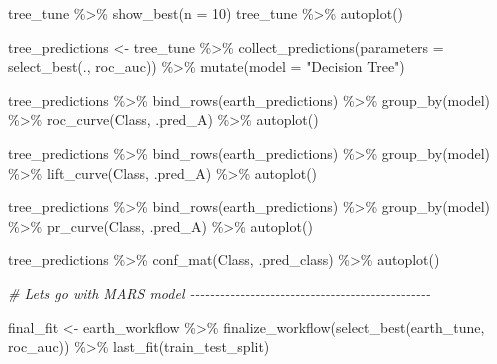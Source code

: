 \documentclass[
]{book}
\newenvironment{Shaded}{\begin{snugshade}}{\end{snugshade}}
\newcommand{\AttributeTok}[1]{\textcolor[rgb]{0.77,0.63,0.00}{#1}}
\newcommand{\CommentTok}[1]{\textcolor[rgb]{0.56,0.35,0.01}{\textit{#1}}}
\newcommand{\DecValTok}[1]{\textcolor[rgb]{0.00,0.00,0.81}{#1}}
\newcommand{\FunctionTok}[1]{\textcolor[rgb]{0.00,0.00,0.00}{#1}}
\newcommand{\NormalTok}[1]{#1}
\newcommand{\OtherTok}[1]{\textcolor[rgb]{0.56,0.35,0.01}{#1}}
\newcommand{\SpecialCharTok}[1]{\textcolor[rgb]{0.00,0.00,0.00}{#1}}
\newcommand{\StringTok}[1]{\textcolor[rgb]{0.31,0.60,0.02}{#1}}
\begin{document}
\begin{Shaded}
\begin{Highlighting}[]
\NormalTok{tree\_tune }\SpecialCharTok{\%\textgreater{}\%} \FunctionTok{show\_best}\NormalTok{(}\AttributeTok{n =} \DecValTok{10}\NormalTok{)}
\NormalTok{tree\_tune }\SpecialCharTok{\%\textgreater{}\%} \FunctionTok{autoplot}\NormalTok{()}

\NormalTok{tree\_predictions }\OtherTok{\textless{}{-}}\NormalTok{ tree\_tune }\SpecialCharTok{\%\textgreater{}\%}
  \FunctionTok{collect\_predictions}\NormalTok{(}\AttributeTok{parameters =} \FunctionTok{select\_best}\NormalTok{(., }\StringTok{\textquotesingle{}roc\_auc\textquotesingle{}}\NormalTok{)) }\SpecialCharTok{\%\textgreater{}\%}
  \FunctionTok{mutate}\NormalTok{(}\AttributeTok{model =} \StringTok{"Decision Tree"}\NormalTok{)}

\NormalTok{tree\_predictions }\SpecialCharTok{\%\textgreater{}\%}
  \FunctionTok{bind\_rows}\NormalTok{(earth\_predictions) }\SpecialCharTok{\%\textgreater{}\%}
  \FunctionTok{group\_by}\NormalTok{(model) }\SpecialCharTok{\%\textgreater{}\%}
  \FunctionTok{roc\_curve}\NormalTok{(Class, .pred\_A) }\SpecialCharTok{\%\textgreater{}\%}
  \FunctionTok{autoplot}\NormalTok{()}

\NormalTok{tree\_predictions }\SpecialCharTok{\%\textgreater{}\%}
  \FunctionTok{bind\_rows}\NormalTok{(earth\_predictions) }\SpecialCharTok{\%\textgreater{}\%}
  \FunctionTok{group\_by}\NormalTok{(model) }\SpecialCharTok{\%\textgreater{}\%}
  \FunctionTok{lift\_curve}\NormalTok{(Class, .pred\_A) }\SpecialCharTok{\%\textgreater{}\%}
  \FunctionTok{autoplot}\NormalTok{()}

\NormalTok{tree\_predictions }\SpecialCharTok{\%\textgreater{}\%}
  \FunctionTok{bind\_rows}\NormalTok{(earth\_predictions) }\SpecialCharTok{\%\textgreater{}\%}
  \FunctionTok{group\_by}\NormalTok{(model) }\SpecialCharTok{\%\textgreater{}\%}  \FunctionTok{pr\_curve}\NormalTok{(Class, .pred\_A) }\SpecialCharTok{\%\textgreater{}\%}
  \FunctionTok{autoplot}\NormalTok{()}

\NormalTok{tree\_predictions }\SpecialCharTok{\%\textgreater{}\%}
  \FunctionTok{conf\_mat}\NormalTok{(Class, .pred\_class) }\SpecialCharTok{\%\textgreater{}\%}
  \FunctionTok{autoplot}\NormalTok{()}


\CommentTok{\# Let\textquotesingle{}s go with MARS model {-}{-}{-}{-}{-}{-}{-}{-}{-}{-}{-}{-}{-}{-}{-}{-}{-}{-}{-}{-}{-}{-}{-}{-}{-}{-}{-}{-}{-}{-}{-}{-}{-}{-}{-}{-}{-}{-}{-}{-}{-}{-}{-}{-}{-}{-}{-}{-}}

\NormalTok{final\_fit }\OtherTok{\textless{}{-}}\NormalTok{ earth\_workflow }\SpecialCharTok{\%\textgreater{}\%}
  \FunctionTok{finalize\_workflow}\NormalTok{(}\FunctionTok{select\_best}\NormalTok{(earth\_tune, }\StringTok{\textquotesingle{}roc\_auc\textquotesingle{}}\NormalTok{)) }\SpecialCharTok{\%\textgreater{}\%}
  \FunctionTok{last\_fit}\NormalTok{(train\_test\_split)}


\end{Highlighting}
\end{Shaded}
\end{document}
